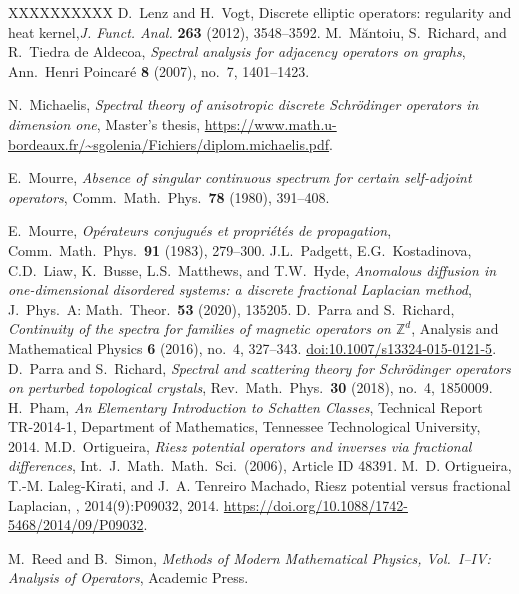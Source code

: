 \documentclass[10pt]{amsart}
\newcommand{\1}{{\mathbb{I}}}
\numberwithin{equation}{section}
\begin{document}
\begin{thebibliography}{XXXXXXXXXX}
 D.~Lenz and H.~Vogt,
Discrete elliptic operators: regularity and heat kernel,\emph{J. Funct. Anal.} \textbf{263} (2012), 3548--3592.
 M.\ M\u{a}ntoiu, S.\ Richard, and R.\ Tiedra de Aldecoa, \emph{Spectral analysis for adjacency operators on graphs}, Ann.\ Henri Poincar\'e {\bf 8} (2007), no.\ 7, 1401--1423.

 N.\ Michaelis, \emph{Spectral theory of anisotropic discrete Schr\"odinger operators in dimension one}, Master's thesis, \url{https://www.math.u-bordeaux.fr/~sgolenia/Fichiers/diplom.michaelis.pdf}.

 E.\ Mourre, \emph{Absence of singular continuous spectrum for certain self-adjoint operators}, Comm.\ Math.\ Phys.\ {\bf 78} (1980), 391--408.

 E.\ Mourre, \emph{Op\'erateurs conjugu\'es et propri\'et\'es de propagation}, Comm.\ Math.\ Phys.\ {\bf 91} (1983), 279--300.
 J.L.\ Padgett, E.G.\ Kostadinova, C.D.\ Liaw, K.\ Busse, L.S.\ Matthews, and T.W.\ Hyde, \emph{Anomalous diffusion in one-dimensional disordered systems: a discrete fractional Laplacian method}, J.\ Phys.\ A: Math.\ Theor.\ {\bf 53} (2020), 135205.
D.~Parra and S.~Richard,
\emph{Continuity of the spectra for families of magnetic operators on $\mathbb{Z}^d$},
Analysis and Mathematical Physics \textbf{6} (2016), no.~4, 327--343.
\href{https://doi.org/10.1007/s13324-015-0121-5}{doi:10.1007/s13324-015-0121-5}.
 D.\ Parra and S.\ Richard, \emph{Spectral and scattering theory for Schr\"odinger operators on perturbed topological crystals}, Rev.\ Math.\ Phys.\ {\bf 30} (2018), no.\ 4, 1850009.
H.~Pham,
\newblock \emph{An Elementary Introduction to Schatten Classes},
\newblock Technical Report TR-2014-1, Department of Mathematics,
Tennessee Technological University, 2014.
 M.D.\ Ortigueira, \emph{Riesz potential operators and inverses via fractional differences}, Int.\ J.\ Math.\ Math.\ Sci.\ (2006), Article ID 48391.
M.~D. Ortigueira, T.-M. Laleg-Kirati, and J.~A. Tenreiro Machado,
\newblock Riesz potential versus fractional Laplacian,
, 2014(9):P09032, 2014.
\newblock \url{https://doi.org/10.1088/1742-5468/2014/09/P09032}.




 M.\ Reed and B.\ Simon, \emph{Methods of Modern Mathematical Physics, Vol.\ I--IV: Analysis of Operators}, Academic Press.



\end{thebibliography}
\end{document}
